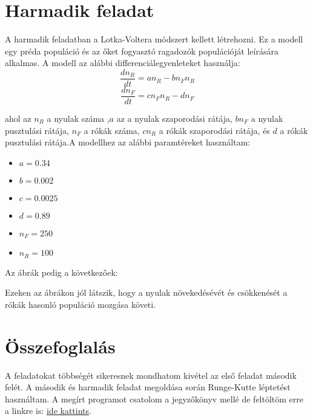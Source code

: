 \documentclass{article}[18pt]
\begin{document}
\section{Harmadik feladat}
A harmadik feladatban a Lotka-Voltera módszert kellett létrehozni. Ez a modell egy préda populáció és az őket fogyasztó ragadozók populációját leírására alkalmas. A modell az alábbi differenciálegyenleteket használja:
\begin{equation}
    \frac{dn_R}{dt}=an_{R}-bn_{F}n_{R}
    \label{visibility}
\end{equation}
\begin{equation}
    \frac{dn_F}{dt}=cn_{F}n_{R}-dn_{F}
    \label{visibility}
\end{equation}

ahol az $n_{R}$ a nyulak száma ,$a$ az a nyulak szaporodási rátája, $bn_{F}$ a nyulak pusztulási rátája, $n_{F}$ a rókák száma, $cn_{R}$ a rókák szaporodási rátája, és $d$ a rókák pusztulási rátája.A modellhez az alábbi paramtéreket használtam:
\begin{itemize}
    \item $a=0.34$
    \item $b=0.002$
    \item $c=0.0025$
    \item $d=0.89$
    \item $n_{F}=250$
    \item $n_{R}=100$
\end{itemize}
Az ábrák pedig a következőek:
\begin{figure}[h]
    \centering
    \qquad
\end{figure}
Ezeken az ábrákon jól látszik, hogy a nyulak növekedésévét és csökkenését a rókák hasonló populáció mozgása követi.

\section{Összefoglalás}
A feladatokat többségét sikeresnek mondhatom kivétel az első feladat második felét. A második és harmadik feladat megoldása során Runge-Kutte léptetést használtam. A megírt programot csatolom a jegyzőkönyv mellé de feltöltöm erre a linkre is:
\href{https://github.com/W0pkr1/Simulation.git}{ide kattints}.
\end{document}
